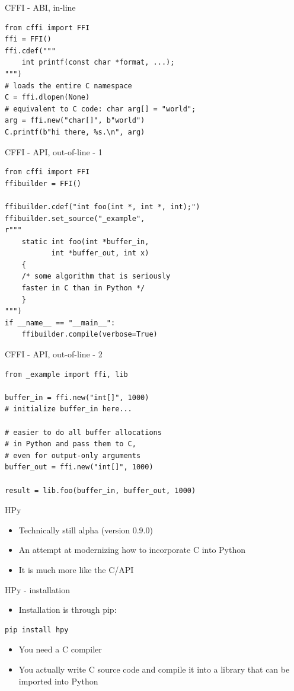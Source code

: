 \documentclass[presentation]{beamer}
\begin{document}
\begin{frame}[label=cffi---abi-in-line,fragile]{CFFI - ABI, in-line}
 \begin{verbatim}
from cffi import FFI
ffi = FFI()
ffi.cdef("""
    int printf(const char *format, ...);
""")
# loads the entire C namespace
C = ffi.dlopen(None)
# equivalent to C code: char arg[] = "world";
arg = ffi.new("char[]", b"world")
C.printf(b"hi there, %s.\n", arg)
\end{verbatim}
\end{frame}
\begin{frame}[label=cffi---api-out-of-line---1,fragile]{CFFI - API, out-of-line - 1}
 \begin{verbatim}
from cffi import FFI
ffibuilder = FFI()

ffibuilder.cdef("int foo(int *, int *, int);")
ffibuilder.set_source("_example",
r"""
    static int foo(int *buffer_in,
           int *buffer_out, int x)
    {
    /* some algorithm that is seriously
    faster in C than in Python */
    }
""")
if __name__ == "__main__":
    ffibuilder.compile(verbose=True)
\end{verbatim}
\end{frame}
\begin{frame}[label=cffi---api-out-of-line---2,fragile]{CFFI - API, out-of-line - 2}
 \begin{verbatim}
from _example import ffi, lib

buffer_in = ffi.new("int[]", 1000)
# initialize buffer_in here...

# easier to do all buffer allocations
# in Python and pass them to C,
# even for output-only arguments
buffer_out = ffi.new("int[]", 1000)

result = lib.foo(buffer_in, buffer_out, 1000)
\end{verbatim}
\end{frame}
\begin{frame}[label=hpy]{HPy}
\begin{itemize}
\item Technically still alpha (version 0.9.0)
\item An attempt at modernizing how to incorporate C into Python
\item It is much more like the C/API
\end{itemize}
\end{frame}
\begin{frame}[label=hpy---installation,fragile]{HPy - installation}
 \begin{itemize}
\item Installation is through pip:
\end{itemize}

\begin{verbatim}
pip install hpy
\end{verbatim}

\begin{itemize}
\item You need a C compiler
\item You actually write C source code and compile it into a library that
can be imported into Python
\end{itemize}
\end{frame}
\end{document}
